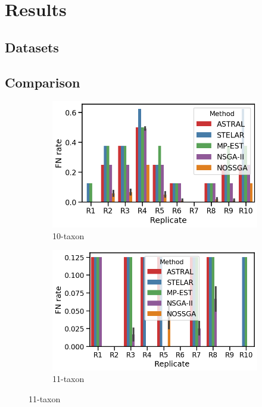 \section{Results}
\subsection{Datasets}

\subsection{Comparison}
\begin{figure}[!htbp]
	\centering
	\begin{adjustwidth}{-1cm}{}
	\begin{subfigure}[b]{0.55\textwidth}
		\includegraphics[width=\textwidth]{Figure/10-taxon_10_replicates}
		\caption{10-taxon}
	\end{subfigure}%
	\begin{subfigure}[b]{0.55\textwidth}
		\includegraphics[width=\textwidth]{Figure/11-taxon_10_replicates}
		\caption{11-taxon}
	\end{subfigure}%


\end{adjustwidth}
\end{figure}
